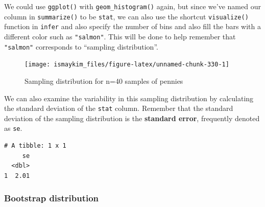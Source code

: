\documentclass[12pt,]{krantz}
\makeatletter
\newenvironment{Shaded}{\begin{snugshade}}{\end{snugshade}}
\newcommand{\KeywordTok}[1]{\textcolor[rgb]{0.27,0.27,0.27}{\textbf{#1}}}
\newcommand{\DataTypeTok}[1]{\textcolor[rgb]{0.27,0.27,0.27}{#1}}
\newcommand{\DecValTok}[1]{\textcolor[rgb]{0.06,0.06,0.06}{#1}}
\newcommand{\StringTok}[1]{\textcolor[rgb]{0.5,0.5,0.5}{#1}}
\newcommand{\OperatorTok}[1]{\textcolor[rgb]{0.43,0.43,0.43}{\textbf{#1}}}
\newcommand{\NormalTok}[1]{#1}
\newenvironment{kframe}{%
\medskip{}
\setlength{\fboxsep}{.8em}
 \def\at@end@of@kframe{}%
 \ifinner\ifhmode%
  \def\at@end@of@kframe{\end{minipage}}%
  \begin{minipage}{\columnwidth}%
 \fi\fi%
 \def\FrameCommand##1{\hskip\@totalleftmargin \hskip-\fboxsep
 \colorbox{shadecolor}{##1}\hskip-\fboxsep
     \hskip-\linewidth \hskip-\@totalleftmargin \hskip\columnwidth}%
 \MakeFramed {\advance\hsize-\width
   \@totalleftmargin\z@ \linewidth\hsize
   \@setminipage}}%
 {\par\unskip\endMakeFramed%
 \at@end@of@kframe}
\renewenvironment{Shaded}{\begin{kframe}}{\end{kframe}}
\theoremstyle{definition}
\theoremstyle{definition}
\theoremstyle{definition}
\theoremstyle{remark}
\makeatother
\begin{document}
We could use \texttt{ggplot()} with \texttt{geom\_histogram()} again,
but since we've named our column in \texttt{summarize()} to be
\texttt{stat}, we can also use the shortcut \texttt{visualize()}
function in \texttt{infer} and also specify the number of bins and also
fill the bars with a different color such as \texttt{"salmon"}. This
will be done to help remember that \texttt{"salmon"} corresponds to
``sampling distribution''.

\begin{Shaded}
\end{Shaded}

\begin{figure}

{\centering \texttt{[image: ismaykim\_files/figure-latex/unnamed-chunk-330-1]} 

}

\caption{Sampling distribution for n=40 samples of pennies}\label{fig:unnamed-chunk-330}
\end{figure}

We can also examine the variability in this sampling distribution by
calculating the standard deviation of the \texttt{stat} column. Remember
that the standard deviation of the sampling distribution is the
\textbf{standard error}, frequently denoted as \texttt{se}.

\begin{Shaded}
\end{Shaded}

\begin{verbatim}
# A tibble: 1 x 1
     se
  <dbl>
1  2.01
\end{verbatim}

\subsubsection*{Bootstrap distribution}\label{bootstrap-distribution}
\end{document}
